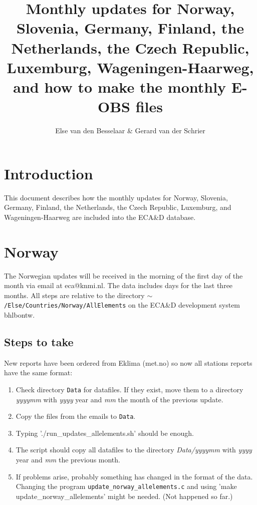 \documentclass[a4paper]{article}
\title{Monthly updates for Norway, Slovenia, Germany, Finland, the
  Netherlands, the Czech Republic, Luxemburg, Wageningen-Haarweg,
  and how to make the monthly E-OBS files}
\author{Else van den Besselaar \& Gerard van der Schrier}
\begin{document}
\maketitle


\section{Introduction}
This document describes how the monthly updates for Norway, Slovenia,
Germany, Finland, the Netherlands, the Czech Republic, Luxemburg, and
Wageningen-Haarweg are included into the ECA\&D database.


\section{Norway}

The Norwegian updates will be received in the morning of the first day
of the month via email at eca@knmi.nl. The data includes days for the
last three months. All steps are relative to the directory
\texttt{$\sim$/Else/Countries/Norway/AllElements} on the ECA\&D development system
bhlbontw.

\subsection*{Steps to take}

New reports have been ordered from Eklima (met.no) so now all stations
reports have the same format:
\begin{enumerate}
\item Check directory \texttt{Data} for datafiles. If they exist, move
  them to a directory \textit{yyyymm} with \textit{yyyy} year and
  \textit{mm} the month of the previous update.
\item Copy the files from the emails to \texttt{Data}.
\item Typing './run\_updates\_allelements.sh' should be enough.
\item The script should copy all datafiles to the directory
  \textit{Data/yyyymm} with \textit{yyyy} year and \textit{mm} the
  previous month.
\item If problems arise, probably something has changed in the format
  of the data. Changing the program
  \texttt{update\_norway\_allelements.c} and using 'make
  update\_norway\_allelements' might be needed. (Not happened so far.)
\end{enumerate}
\end{document}
